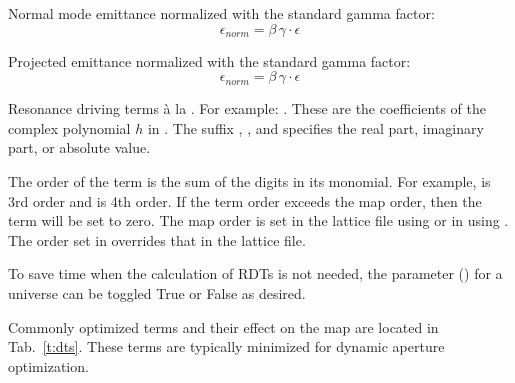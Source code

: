 \begin{description}
{{{{{{  %
  \item[norm_emit.a, .b, .c] \Newline {}
Normal mode emittance normalized with the standard gamma factor:
\begin{equation}
  \epsilon_{norm} = \beta \, \gamma \cdot \epsilon
\end{equation}

  \item[norm_emit.x, .y, .z] \Newline {}
Projected emittance normalized with the standard gamma factor:
\begin{equation}
  \epsilon_{norm} = \beta \, \gamma \cdot \epsilon
\end{equation}

  \item[normal.h.<monomial>.\{r,i,a\}] \Newline {}
Resonance driving terms \`a la \cite{b:bengtsson}.  For example: .  These are the
coefficients of the complex polynomial $h$ in .  The suffix , , and
 specifies the real part, imaginary part, or absolute value.

The order of the term is the sum of the digits in its monomial.  For example,  is 3rd
order and  is 4th order.  If the term order exceeds the map order, then the term will be
set to zero. The map order is set in the lattice file using 
or in  using .  The order set in 
overrides that in the lattice file.

To save time when the calculation of RDTs is not needed, the  parameter
() for a universe can be toggled True or False as desired.

Commonly optimized terms and their effect on the map are located in Tab.~\ref{t:dts}.  These terms are typically
minimized for dynamic aperture optimization.

}}}}}}
\end{description}
